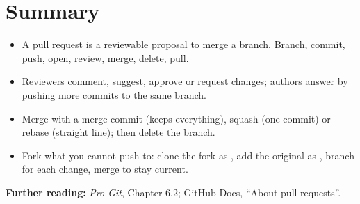 \section{Summary}

\begin{itemize}
  \item A pull request is a reviewable proposal to merge a branch. Branch, commit, push, open, review, merge, delete, pull.
  \item Reviewers comment, suggest, approve or request changes; authors answer by pushing more commits to the same branch.
  \item Merge with a merge commit (keeps everything), squash (one commit) or rebase (straight line); then delete the branch.
  \item Fork what you cannot push to: clone the fork as , add the original as , branch for each change, merge  to stay current.
\end{itemize}

\textbf{Further reading:} \emph{Pro Git}, Chapter 6.2; GitHub Docs, ``About pull requests''.

\solutionspage




